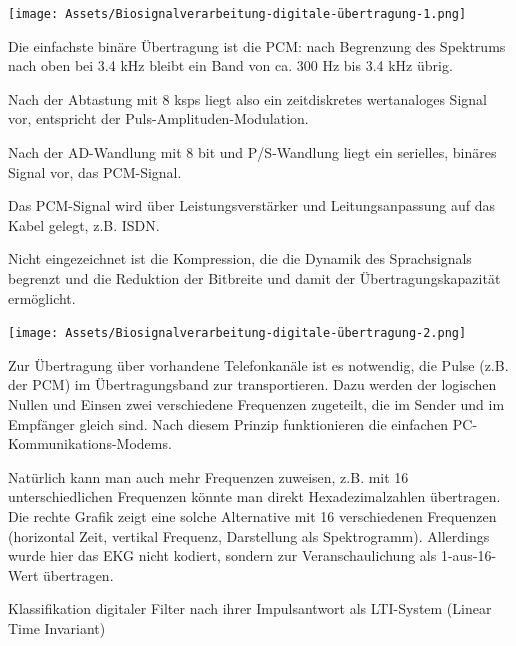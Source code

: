 \documentclass[a4paper]{article}
\begin{document}
\begin{multicols}{3}
  \begin{itemize*}
    \item \texttt{[image: Assets/Biosignalverarbeitung-digitale-übertragung-1.png]}
    \item Die einfachste binäre Übertragung ist die PCM: nach Begrenzung des Spektrums nach oben bei 3.4 kHz bleibt ein Band von ca. 300 Hz bis 3.4 kHz übrig.
    \begin{itemize*}
      \item Nach der Abtastung mit 8 ksps liegt also ein zeitdiskretes wertanaloges Signal vor, entspricht der Puls-Amplituden-Modulation.
      \item Nach der AD-Wandlung mit 8 bit und P/S-Wandlung liegt ein serielles, binäres Signal vor, das PCM-Signal.
      \item Das PCM-Signal wird über Leistungsverstärker und Leitungsanpassung auf das Kabel gelegt, z.B. ISDN.
      \item Nicht eingezeichnet ist die Kompression, die die Dynamik des Sprachsignals begrenzt und die Reduktion der Bitbreite und damit der Übertragungskapazität ermöglicht.
    \end{itemize*}
    \item \texttt{[image: Assets/Biosignalverarbeitung-digitale-übertragung-2.png]}
    \item Zur Übertragung über vorhandene Telefonkanäle ist es notwendig, die Pulse (z.B. der PCM) im Übertragungsband zur transportieren. Dazu werden der logischen Nullen und Einsen zwei verschiedene Frequenzen zugeteilt, die im Sender und im Empfänger gleich sind. Nach diesem Prinzip funktionieren die einfachen PC-Kommunikations-Modems.
    \item Natürlich kann man auch mehr Frequenzen zuweisen, z.B. mit 16 unterschiedlichen Frequenzen könnte man direkt Hexadezimalzahlen übertragen. Die rechte Grafik zeigt eine solche Alternative mit 16 verschiedenen Frequenzen (horizontal Zeit, vertikal Frequenz, Darstellung als Spektrogramm). Allerdings wurde hier das EKG nicht kodiert, sondern zur Veranschaulichung als 1-aus-16-Wert übertragen.
  \end{itemize*}

  Klassifikation digitaler Filter nach ihrer Impulsantwort als LTI-System
  (Linear Time Invariant)


\end{multicols}
\end{document}
